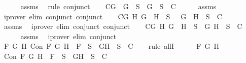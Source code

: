 \begin{isabellebody}
\ \ \ \ \isamarkupfalse%
\ assms\ \isamarkupfalse%
\ {\isacharparenleft}rule\ conjunct{}{\isacharparenright}\isanewline
\ \ \isamarkupfalse%
\ C{}{\isacharcolon}{\isachardoublequoteopen}{\isasymforall}G{\isachardot}\ \isactrlbold {\isasymnot}\ {\isacharparenleft}\isactrlbold {\isasymnot}G{\isacharparenright}\ {\isasymin}\ S\ {\isasymlongrightarrow}\ {\isacharbraceleft}G{\isacharbraceright}\ {\isasymunion}\ S\ {\isasymin}\ C{\isachardoublequoteclose}\isanewline
\ \ \ \ \isamarkupfalse%
\ assms\ \isamarkupfalse%
\ {\isacharparenleft}iprover\ elim{\isacharcolon}\ conjunct{}\ conjunct{}{\isacharparenright}\isanewline
\ \ \isamarkupfalse%
\ C{}{\isacharcolon}{\isachardoublequoteopen}{\isasymforall}G\ H{\isachardot}\ \isactrlbold {\isasymnot}{\isacharparenleft}G\ \isactrlbold {\isasymor}\ H{\isacharparenright}\ {\isasymin}\ S\ {\isasymlongrightarrow}\ {\isacharbraceleft}\isactrlbold {\isasymnot}\ G{\isacharcomma}\ \isactrlbold {\isasymnot}\ H{\isacharbraceright}\ {\isasymunion}\ S\ {\isasymin}\ C{\isachardoublequoteclose}\isanewline
\ \ \ \ \isamarkupfalse%
\ assms\ \isamarkupfalse%
\ {\isacharparenleft}iprover\ elim{\isacharcolon}\ conjunct{}\ conjunct{}{\isacharparenright}\isanewline
\ \ \isamarkupfalse%
\ C{}{\isacharcolon}{\isachardoublequoteopen}{\isasymforall}G\ H{\isachardot}\ \isactrlbold {\isasymnot}{\isacharparenleft}G\ \isactrlbold {\isasymrightarrow}\ H{\isacharparenright}\ {\isasymin}\ S\ {\isasymlongrightarrow}\ {\isacharbraceleft}G{\isacharcomma}\isactrlbold {\isasymnot}\ H{\isacharbraceright}\ {\isasymunion}\ S\ {\isasymin}\ C{\isachardoublequoteclose}\isanewline
\ \ \ \ \isamarkupfalse%
\ assms\ \isamarkupfalse%
\ {\isacharparenleft}iprover\ elim{\isacharcolon}\ conjunct{}{\isacharparenright}\ \isanewline
\ \ \isamarkupfalse%
\ {\isachardoublequoteopen}{\isasymforall}F\ G\ H{\isachardot}\ Con\ F\ G\ H\ {\isasymlongrightarrow}\ F\ {\isasymin}\ S\ {\isasymlongrightarrow}\ {\isacharbraceleft}G{\isacharcomma}H{\isacharbraceright}\ {\isasymunion}\ S\ {\isasymin}\ C{\isachardoublequoteclose}\isanewline
\ \ \isamarkupfalse%
\ {\isacharparenleft}rule\ allI{\isacharparenright}{\isacharplus}\isanewline
\ \ \ \ \isamarkupfalse%
\ F\ G\ H\isanewline
\ \ \ \ \isamarkupfalse%
\ {\isachardoublequoteopen}Con\ F\ G\ H\ {\isasymlongrightarrow}\ F\ {\isasymin}\ S\ {\isasymlongrightarrow}\ {\isacharbraceleft}G{\isacharcomma}H{\isacharbraceright}\ {\isasymunion}\ S\ {\isasymin}\ C{\isachardoublequoteclose}\isanewline

\end{isabellebody}
